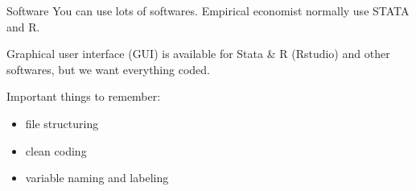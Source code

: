 \documentclass[handout]{beamer}
\begin{document}
\begin{frame}{Software}
You can use lots of softwares. Empirical economist normally use STATA and R.\bigskip

Graphical user interface (GUI) is available for Stata \& R (Rstudio) and other softwares, but we want everything coded.\medskip


Important things to remember:
\begin{itemize}
	\item file structuring
	\item clean coding
	\item variable naming and labeling
\end{itemize}
\end{frame}


\end{document}
